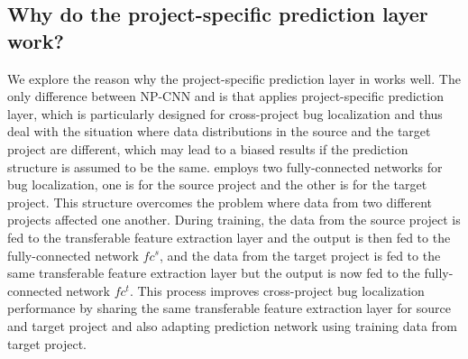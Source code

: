 \subsection{Why do the project-specific prediction layer work? }
We explore the reason why the project-specific prediction layer in \TRANPCNN works well. The only difference between NP-CNN and \TRANPCNN is that \TRANPCNN applies project-specific prediction layer, which is particularly designed for cross-project bug localization and thus deal with the situation where data distributions in the source and the target project are different, which may lead to a biased results if the prediction structure is assumed to be the same. \TRANPCNN employs two fully-connected networks for bug localization, one is for the source project and the other is for the target project. This structure overcomes the problem where data from two different projects affected one another. During training, the data from the source project is fed to the transferable feature extraction layer and the output is then fed to the fully-connected network $fc^s$, and the data from the target project is fed to the same transferable feature extraction layer but the output is now fed to the fully-connected network $fc^t$. This process improves cross-project bug localization performance by sharing the same transferable feature extraction layer for source and target project and also adapting prediction network using training data from target project. 

